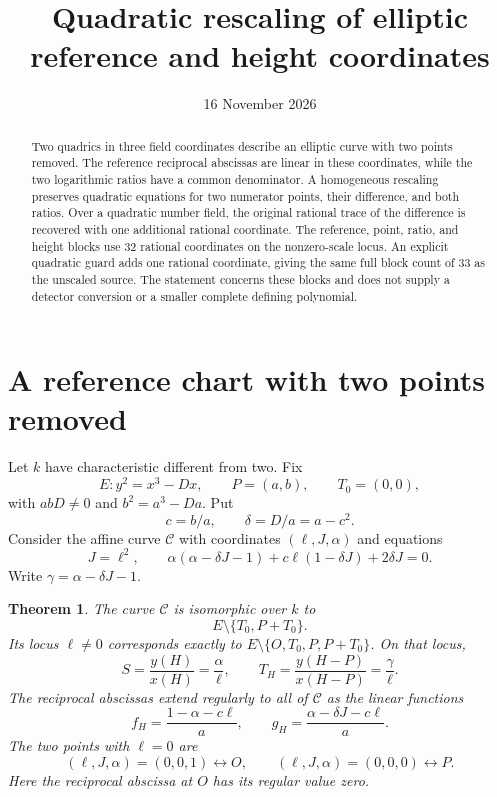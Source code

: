 \documentclass[11pt,a4paper]{article}
\title{Quadratic rescaling of elliptic reference and height coordinates}
\author{}\date{16 November 2026}
\newtheorem{theorem}{Theorem}[section]
\theoremstyle{remark}\newtheorem{remark}[theorem]{Remark}
\begin{document}
\maketitle
\begin{abstract}
Two quadrics in three field coordinates describe an elliptic curve with
two points removed. The reference reciprocal abscissas are linear in
these coordinates, while the two logarithmic ratios have a common
denominator. A homogeneous rescaling preserves quadratic equations for
two numerator points, their difference, and both ratios. Over a quadratic
number field, the original rational trace of the difference is recovered
with one additional rational coordinate. The reference, point, ratio,
and height blocks use 32 rational coordinates on the nonzero-scale
locus. An explicit quadratic guard adds one rational coordinate,
giving the same full block count of 33 as the unscaled source.
The statement concerns these blocks and does not supply a detector
conversion or a smaller complete defining polynomial.
\end{abstract}

\section{A reference chart with two points removed}
Let $k$ have characteristic different from two. Fix
\[
 E:y^2=x^3-Dx,\qquad P=(a,b),\qquad T_0=(0,0),
\]
with $abD\ne0$ and $b^2=a^3-Da$. Put
\[
 c=b/a,\qquad\delta=D/a=a-c^2.
\]
Consider the affine curve $\mathcal C$ with coordinates
$(\ell,J,\alpha)$ and equations
\begin{equation}\label{eq:compact}
 J=\ell^2,\qquad
 \alpha(\alpha-\delta J-1)+c\ell(1-\delta J)+2\delta J=0.
\end{equation}
Write $\gamma=\alpha-\delta J-1$.

\begin{theorem}\label{thm:chart}
The curve $\mathcal C$ is isomorphic over $k$ to
\[
                       E\setminus\{T_0,P+T_0\}.
\]
Its locus $\ell\ne0$ corresponds exactly to
$E\setminus\{O,T_0,P,P+T_0\}$. On that locus,
\begin{equation}\label{eq:ratios}
       S=\frac{y(H)}{x(H)}=\frac{\alpha}{\ell},\qquad
       T_H=\frac{y(H-P)}{x(H-P)}=\frac{\gamma}{\ell}.
\end{equation}
The reciprocal abscissas extend regularly to all of $\mathcal C$ as
the linear functions
\begin{equation}\label{eq:recips}
 f_H=\frac{1-\alpha-c\ell}{a},\qquad
 g_H=\frac{\alpha-\delta J-c\ell}{a}.
\end{equation}
The two points with $\ell=0$ are
\[
 (\ell,J,\alpha)=(0,0,1)\longleftrightarrow O,
 \qquad
 (\ell,J,\alpha)=(0,0,0)\longleftrightarrow P.
\]
Here the reciprocal abscissa at $O$ has its regular value zero.
\end{theorem}
\end{document}
